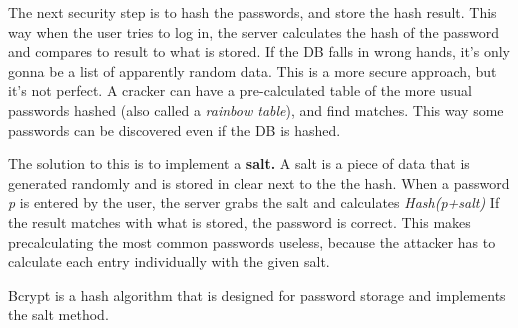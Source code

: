 The next security step is to hash the passwords, and store the hash result. This way when the user tries to log in, the server calculates the hash of the password and compares to result to what is stored. If the DB falls in wrong hands, it's only gonna be a list of apparently random data. This is a more secure approach, but it's not perfect. A cracker can have a pre-calculated table of the more usual passwords hashed (also called a \textit{rainbow table}), and find matches. This way some passwords can be discovered even if the DB is hashed.

The solution to this is to implement a \textbf{salt.} A salt is a piece of data that is generated randomly and is stored in clear next to the the hash. When a password \textit{p} is entered by the user, the server grabs the salt and calculates \textit{Hash(p+salt)} If the result matches with what is stored, the password is correct. This makes precalculating the most common passwords useless, because the attacker has to calculate each entry individually with the given salt.

Bcrypt is a hash algorithm that is designed for password storage and implements the salt method.
